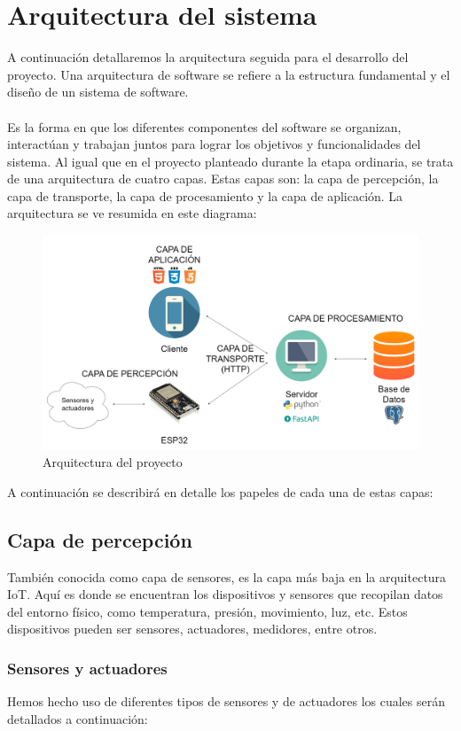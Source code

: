 \documentclass[12pt]{report}
\begin{document}
\chapter{Arquitectura del sistema}
A continuación detallaremos la arquitectura seguida para el desarrollo del proyecto. Una arquitectura de software se refiere a la estructura fundamental y el diseño de un sistema de software. 
\\\\Es la forma en que los diferentes componentes del software se organizan, interactúan y trabajan juntos para lograr los objetivos y funcionalidades del sistema.
Al igual que en el proyecto planteado durante la etapa ordinaria, se trata de una arquitectura de cuatro capas. Estas capas son: la capa de percepción, la capa de transporte, la capa de procesamiento y la capa de aplicación.
La arquitectura se ve resumida en este diagrama:
\begin{figure}[H]
    \centering
    \includegraphics[width=0.75\linewidth]{imagenes//diagramas/Diagrama arquitectura.png}
    \caption{Arquitectura del proyecto}
    \label{fig:enter-label}
\end{figure}
A continuación se describirá en detalle los papeles de cada una de estas capas:
\newpage
\section{Capa de percepción}
También conocida como capa de sensores, es la capa más baja en la arquitectura IoT. Aquí es donde se encuentran los dispositivos y sensores que recopilan datos del entorno físico, como temperatura, presión, movimiento, luz, etc. Estos dispositivos pueden ser sensores, actuadores, medidores, entre otros.
\subsection{Sensores y actuadores}
Hemos hecho uso de diferentes tipos de sensores y de actuadores los cuales serán detallados a continuación:
\end{document}
